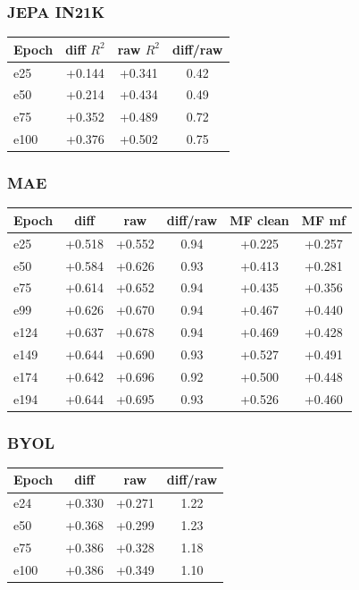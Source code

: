 \documentclass{article}
\begin{document}
\subsubsection{JEPA IN21K}
\begin{center}
\begin{tabular}{lccc}
\toprule
Epoch & diff $R^2$ & raw $R^2$ & diff/raw \\
\midrule
e25  & +0.144 & +0.341 & 0.42 \\
e50  & +0.214 & +0.434 & 0.49 \\
e75  & +0.352 & +0.489 & 0.72 \\
e100 & +0.376 & +0.502 & 0.75 \\
\bottomrule
\end{tabular}
\end{center}

\subsubsection{MAE}
\begin{center}
\begin{tabular}{lccccc}
\toprule
Epoch & diff & raw & diff/raw & MF clean & MF mf \\
\midrule
e25  & +0.518 & +0.552 & 0.94 & +0.225 & +0.257 \\
e50  & +0.584 & +0.626 & 0.93 & +0.413 & +0.281 \\
e75  & +0.614 & +0.652 & 0.94 & +0.435 & +0.356 \\
e99  & +0.626 & +0.670 & 0.94 & +0.467 & +0.440 \\
e124 & +0.637 & +0.678 & 0.94 & +0.469 & +0.428 \\
e149 & +0.644 & +0.690 & 0.93 & +0.527 & +0.491 \\
e174 & +0.642 & +0.696 & 0.92 & +0.500 & +0.448 \\
e194 & +0.644 & +0.695 & 0.93 & +0.526 & +0.460 \\
\bottomrule
\end{tabular}
\end{center}

\subsubsection{BYOL}
\begin{center}
\begin{tabular}{lccc}
\toprule
Epoch & diff & raw & diff/raw \\
\midrule
e24  & +0.330 & +0.271 & 1.22 \\
e50  & +0.368 & +0.299 & 1.23 \\
e75  & +0.386 & +0.328 & 1.18 \\
e100 & +0.386 & +0.349 & 1.10 \\
\bottomrule
\end{tabular}
\end{center}
\end{document}
